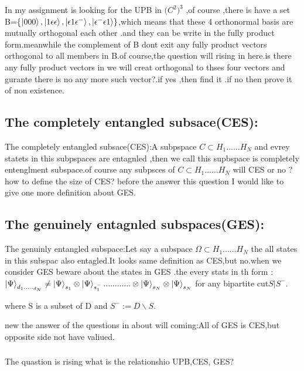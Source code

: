 \documentclass[a4paper,12pt]{article}
\begin{document}
 
 In my assignment is looking for the UPB in ${(C^{2}})^{3}$ ,of course ,there is have a set B=\{${\ket{000},\ket{1\epsilon\epsilon},\ket{\epsilon1\epsilon^{-}},\ket{\epsilon^{-}\epsilon1}\}}$,which means that these 4 orthonormal basis are mutually orthogonal each other .and they can be write in the fully product form.meanwhile the complement of B dont exit any fully product vectors orthogonal to all members in B.of course,the question will rising in here.is there any fully product vectors in we will creat orthogonal to thses four vectors and gurante there is no any more such vector?.if yes ,then find it .if no then prove it of non existence.
 
\subsection{The completely entangled subsace(CES):}
	The completely entangled subsace(CES):A subpspace $C\subset H_{1}......H_{N}$ and evrey statets in this subpspaces are entagnled ,then we call this supbspace is completely entenglment subspace.of course any subpsces of $C\subset H_{1}......H_{N}$  will CES or no ?how to define the size of CES?
	before the answer this question I would like to give one more definition about GES.
	
	\subsection{The genuinely entagnled subspaces(GES):}
	The genuinly entangled subspace:Let say a subspace $\varOmega \subset H_{1}......H_{N} $ the all states in this subspac also entagled.It looks same definition as CES,but no.when we consider GES beware about the states in GES .the every stats in th form :
	${\ket{\Psi}_{d_{1}....._{d_{N}}}\neq\ket{\Psi}_{s_{1}}\otimes\ket{\Psi}_{s_{1}^{-}}............\otimes\ket{\Psi}_{s_{N}}\otimes\ket{\Psi}_{s_{N}}}$
	for any bipartite cut$ S|S^{-}$.
	
	where S is a subset of D and $S^{-}:=D \backslash S$.

 
 
 new the answer of the questions in about will coming:All of GES is CES,but opposite side not have valiued.
 
 \subsubsection{}
 
 \title{\large }{The quastion is rising what is the relationshio UPB,CES, GES?}
\end{document}
